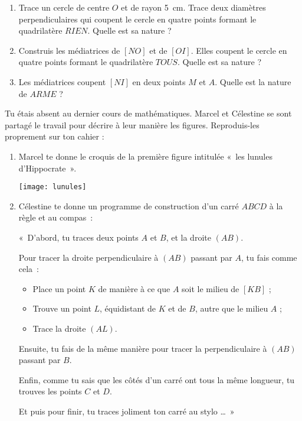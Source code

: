 \begin{exercice}
\begin{enumerate}
 \item Trace un cercle de centre $O$ et de rayon 5 cm. Trace deux diamètres perpendiculaires qui coupent le cercle en quatre points formant le quadrilatère $RIEN$. Quelle est sa nature ?
 \item Construis les médiatrices de $[NO]$ et de $[OI]$. Elles coupent le cercle en quatre points formant le quadrilatère $TOUS$. Quelle est sa nature ?
 \item Les médiatrices coupent $[NI]$ en deux points $M$ et $A$. Quelle est la nature de $ARME$ ?
 \end{enumerate}
\end{exercice}


\begin{exercice}
Tu étais absent au dernier cours de mathématiques. Marcel et Célestine se sont partagé le travail pour décrire à leur manière les figures. Reproduis-les proprement sur ton cahier :
\begin{enumerate}
 \item Marcel te donne le croquis de la première figure intitulée « les lunules d'Hippocrate ».
 \begin{center} \texttt{[image: lunules]} \end{center}
 \item Célestine te donne un programme de construction d'un carré $ABCD$ à la règle et au compas :
 
« D'abord, tu traces deux points $A$ et $B$, et la droite $(AB)$.

Pour tracer la droite perpendiculaire à $(AB)$ passant par $A$, tu fais comme cela :
 \begin{itemize}
  \item Place un point $K$ de manière à ce que $A$ soit le milieu de $[KB]$ ;
  \item Trouve un point $L$, équidistant de $K$ et de $B$, autre que le milieu $A$ ;
  \item Trace la droite $(AL)$.
  \end{itemize}
Ensuite, tu fais de la même manière pour tracer la perpendiculaire à $(AB)$ passant par $B$.
  
Enfin, comme tu sais que les côtés d'un carré ont tous la même longueur, tu trouves les points $C$ et $D$.

Et puis pour finir, tu traces joliment ton carré au stylo … »
 \end{enumerate}
\end{exercice}



